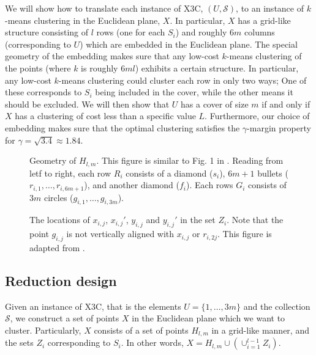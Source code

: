\documentclass[12pt]{article}
\newcommand{\mc}{\mathcal}
\begin{document}
We will show how to translate each instance of X3C, $(U,\mc S)$, to an instance of $k$-means clustering in the Euclidean plane, $X$. In particular, $X$ has a grid-like structure consisting of $l$ rows (one for each $S_i$) and roughly $6m$ columns (corresponding to $U$) which are embedded in the Euclidean plane. The special geometry of the embedding makes sure that any low-cost $k$-means clustering of the points (where $k$ is roughly $6ml$) exhibits a certain structure. In particular, any low-cost $k$-means clustering could cluster each row in only two ways; One of these corresponds to $S_i$ being included in the cover, while the other means it should be excluded. We will then show that $U$ has a cover of size $m$ if and only if $X$ has a clustering of cost less than a specific value $L$. Furthermore, our choice of embedding makes sure that the optimal clustering satisfies the $\gamma$-margin property for $\gamma=\sqrt{3.4} \approx 1.84$.

  \begin{figure}[!tbp]
  \centering
  \begin{minipage}[b]{0.49\textwidth}
    \resizebox{\linewidth}{!}{}
    \caption{Geometry of $H_{l,m}$. This figure is similar to Fig. 1 in \cite{vattani2009hardness}.  
    Reading from letf to right, each row $R_i$ consists of a diamond ($s_i$), $6m+1$ bullets ($r_{i,1},\ldots,r_{i,6m+1}$), and another diamond ($f_i$). Each rows $G_i$ consists of $3m$ circles ($g_{i,1}, \ldots, g_{i,3m}$).}
    \label{fig:lowerBoundComponent}
  \end{minipage}
  \hfill
  \begin{minipage}[b]{0.49\textwidth}
    
    \caption{The locations of $x_{i,j}$, $x_{i,j}'$, $y_{i,j}$ and $y_{i,j}'$ in the set $Z_i$. Note that the point $g_{i,j}$ is not vertically aligned with $x_{i, j}$ or $r_{i, 2j}$. This figure is adapted from \cite{vattani2009hardness}.}
    \label{fig:ZFig}
  \end{minipage}
\end{figure}

\subsection{Reduction design}
Given an instance of X3C, that is the elements $U = \{1, \ldots, 3m\}$ and the collection $\mc S$, we construct a set of points $X$ in the Euclidean plane which we want to cluster. Particularly, $X$ consists of a set of points $H_{l,m}$ in a grid-like manner, and the sets $Z_i$ corresponding to $S_i$. In other words, $X = H_{l,m} \cup (\cup_{i=1}^{l-1} Z_i)$. 
\end{document}
